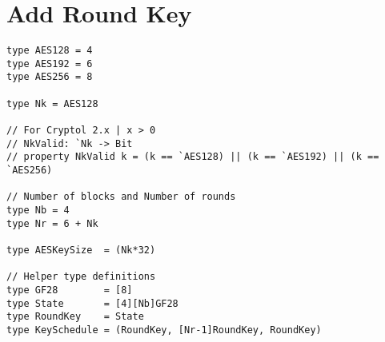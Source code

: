 \section{Add Round Key}
\begin{lstlisting}[style=cryptol]
type AES128 = 4
type AES192 = 6
type AES256 = 8

type Nk = AES128

// For Cryptol 2.x | x > 0
// NkValid: `Nk -> Bit
// property NkValid k = (k == `AES128) || (k == `AES192) || (k == `AES256)

// Number of blocks and Number of rounds
type Nb = 4
type Nr = 6 + Nk

type AESKeySize  = (Nk*32)

// Helper type definitions
type GF28        = [8]
type State       = [4][Nb]GF28
type RoundKey    = State
type KeySchedule = (RoundKey, [Nr-1]RoundKey, RoundKey)
\end{lstlisting}
